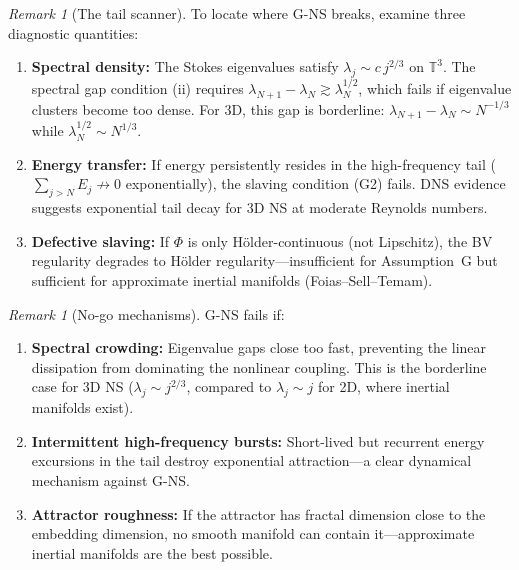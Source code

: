 \documentclass[12pt,a4paper]{article}
\theoremstyle{definition}
\theoremstyle{plain}
\theoremstyle{remark}
\newtheorem{remark}[definition]{Remark}
\begin{document}
\begin{remark}[The tail scanner]\label{rem:tail-scanner}
To locate where G-NS breaks, examine three diagnostic quantities:
\begin{enumerate}
\item \textbf{Spectral density:} The Stokes eigenvalues satisfy $\lambda_j \sim c\, j^{2/3}$ on $\mathbb{T}^3$. The spectral gap condition (ii) requires $\lambda_{N+1} - \lambda_N \gtrsim \lambda_N^{1/2}$, which fails if eigenvalue clusters become too dense. For 3D, this gap is borderline: $\lambda_{N+1} - \lambda_N \sim N^{-1/3}$ while $\lambda_N^{1/2} \sim N^{1/3}$.
\item \textbf{Energy transfer:} If energy persistently resides in the high-frequency tail ($\sum_{j > N} E_j \not\to 0$ exponentially), the slaving condition (G2) fails. DNS evidence suggests exponential tail decay for 3D NS at moderate Reynolds numbers.
\item \textbf{Defective slaving:} If $\Phi$ is only H\"older-continuous (not Lipschitz), the BV regularity degrades to H\"older regularity---insufficient for Assumption~G but sufficient for approximate inertial manifolds (Foias--Sell--Temam).
\end{enumerate}
\end{remark}

\begin{remark}[No-go mechanisms]\label{rem:g-nogo}
G-NS fails if:
\begin{enumerate}
\item \textbf{Spectral crowding:} Eigenvalue gaps close too fast, preventing the linear dissipation from dominating the nonlinear coupling. This is the borderline case for 3D NS ($\lambda_j \sim j^{2/3}$, compared to $\lambda_j \sim j$ for 2D, where inertial manifolds exist).
\item \textbf{Intermittent high-frequency bursts:} Short-lived but recurrent energy excursions in the tail destroy exponential attraction---a clear dynamical mechanism against G-NS.
\item \textbf{Attractor roughness:} If the attractor has fractal dimension close to the embedding dimension, no smooth manifold can contain it---approximate inertial manifolds are the best possible.
\end{enumerate}
\end{remark}
\end{document}
